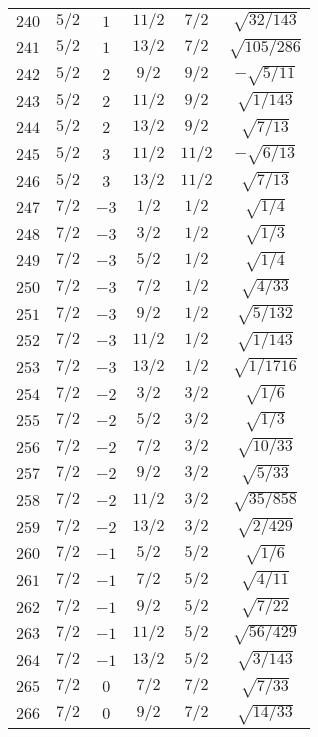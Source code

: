 \begin{table}
\begin{center}
\begin{tabular}{|c|c|c|c|c|c|}
$240$ & $5/2$ & $1$ & $11/2$ & $7/2$ & $\sqrt{32/143}$ \\ 
$241$ & $5/2$ & $1$ & $13/2$ & $7/2$ & $\sqrt{105/286}$ \\ 
$242$ & $5/2$ & $2$ & $9/2$ & $9/2$ & $-\sqrt{5/11}$ \\ 
$243$ & $5/2$ & $2$ & $11/2$ & $9/2$ & $\sqrt{1/143}$ \\ 
$244$ & $5/2$ & $2$ & $13/2$ & $9/2$ & $\sqrt{7/13}$ \\ 
$245$ & $5/2$ & $3$ & $11/2$ & $11/2$ & $-\sqrt{6/13}$ \\ 
$246$ & $5/2$ & $3$ & $13/2$ & $11/2$ & $\sqrt{7/13}$ \\ 
$247$ & $7/2$ & $-3$ & $1/2$ & $1/2$ & $\sqrt{1/4}$ \\ 
$248$ & $7/2$ & $-3$ & $3/2$ & $1/2$ & $\sqrt{1/3}$ \\ 
$249$ & $7/2$ & $-3$ & $5/2$ & $1/2$ & $\sqrt{1/4}$ \\ 
$250$ & $7/2$ & $-3$ & $7/2$ & $1/2$ & $\sqrt{4/33}$ \\ 
$251$ & $7/2$ & $-3$ & $9/2$ & $1/2$ & $\sqrt{5/132}$ \\ 
$252$ & $7/2$ & $-3$ & $11/2$ & $1/2$ & $\sqrt{1/143}$ \\ 
$253$ & $7/2$ & $-3$ & $13/2$ & $1/2$ & $\sqrt{1/1716}$ \\ 
$254$ & $7/2$ & $-2$ & $3/2$ & $3/2$ & $\sqrt{1/6}$ \\ 
$255$ & $7/2$ & $-2$ & $5/2$ & $3/2$ & $\sqrt{1/3}$ \\ 
$256$ & $7/2$ & $-2$ & $7/2$ & $3/2$ & $\sqrt{10/33}$ \\ 
$257$ & $7/2$ & $-2$ & $9/2$ & $3/2$ & $\sqrt{5/33}$ \\ 
$258$ & $7/2$ & $-2$ & $11/2$ & $3/2$ & $\sqrt{35/858}$ \\ 
$259$ & $7/2$ & $-2$ & $13/2$ & $3/2$ & $\sqrt{2/429}$ \\ 
$260$ & $7/2$ & $-1$ & $5/2$ & $5/2$ & $\sqrt{1/6}$ \\ 
$261$ & $7/2$ & $-1$ & $7/2$ & $5/2$ & $\sqrt{4/11}$ \\ 
$262$ & $7/2$ & $-1$ & $9/2$ & $5/2$ & $\sqrt{7/22}$ \\ 
$263$ & $7/2$ & $-1$ & $11/2$ & $5/2$ & $\sqrt{56/429}$ \\ 
$264$ & $7/2$ & $-1$ & $13/2$ & $5/2$ & $\sqrt{3/143}$ \\ 
$265$ & $7/2$ & $0$ & $7/2$ & $7/2$ & $\sqrt{7/33}$ \\ 
$266$ & $7/2$ & $0$ & $9/2$ & $7/2$ & $\sqrt{14/33}$ \\ 

\end{tabular}
\end{center}
\end{table}
